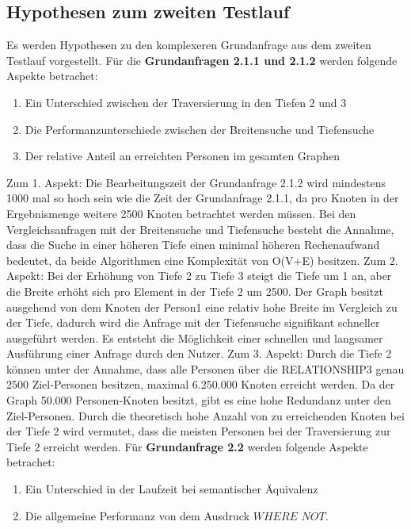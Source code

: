 \subsection{Hypothesen zum zweiten Testlauf}
Es werden Hypothesen zu den komplexeren Grundanfrage aus dem zweiten Testlauf vorgestellt. \newline \newline
Für die \textbf{Grundanfragen 2.1.1 und 2.1.2} werden folgende Aspekte betrachet: 
\begin{enumerate}
	\item Ein Unterschied zwischen der Traversierung in den Tiefen 2 und 3 
	\item Die Performanzunterschiede zwischen der Breitensuche und Tiefensuche
	\item Der relative Anteil an erreichten Personen im gesamten Graphen
\end{enumerate}
Zum 1. Aspekt: Die Bearbeitungszeit der Grundanfrage 2.1.2 wird mindestens 1000 mal so hoch sein wie die Zeit der Grundanfrage 2.1.1, da pro Knoten in der Ergebnismenge weitere 2500 Knoten betrachtet werden müssen. Bei den Vergleichsanfragen mit der  Breitensuche und Tiefensuche besteht die Annahme, dass die Suche in einer höheren Tiefe einen minimal höheren Rechenaufwand bedeutet, da beide Algorithmen eine Komplexität von O(V+E) besitzen. \newline
Zum 2. Aspekt: Bei der Erhöhung von Tiefe 2 zu Tiefe 3 steigt die Tiefe um 1 an, aber die Breite erhöht sich pro Element in der Tiefe 2 um 2500. Der Graph besitzt ausgehend von dem Knoten der Person1 eine relativ hohe Breite im Vergleich zu der Tiefe, dadurch wird die Anfrage mit der Tiefensuche signifikant schneller ausgeführt werden. Es entsteht die Möglichkeit einer schnellen und langsamer Ausführung einer Anfrage durch den Nutzer. \newline
Zum 3. Aspekt: Durch die Tiefe 2 können unter der Annahme, dass alle Personen über die RELATIONSHIP3 genau 2500 Ziel-Personen besitzen, maximal 6.250.000 Knoten erreicht werden. Da der Graph 50.000 Personen-Knoten besitzt, gibt es eine hohe Redundanz unter den Ziel-Personen. Durch die theoretisch hohe Anzahl von zu erreichenden Knoten bei der Tiefe 2 wird vermutet, dass die meisten Personen bei der Traversierung zur Tiefe 2 erreicht werden. \newline \newline
Für \textbf{Grundanfrage 2.2} werden folgende Aspekte betrachet: 
\begin{enumerate}
	\item Ein Unterschied in der Laufzeit bei  semantischer Äquivalenz  
	\item Die allgemeine Performanz von dem Ausdruck $WHERE$ $NOT$.
\end{enumerate}
